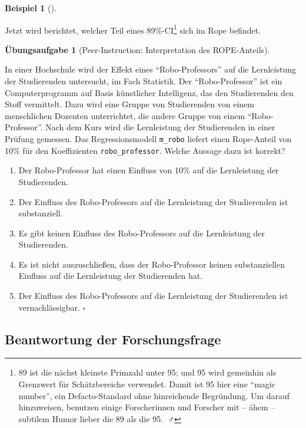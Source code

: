\documentclass[
  ngerman,
  letterpaper,
  twoside,
  open=any]{scrbook}
\providecommand{\tightlist}{%
  \setlength{\itemsep}{0pt}\setlength{\parskip}{0pt}}\usepackage{longtable,booktabs,array}
\theoremstyle{definition}
\newtheorem{example}{Beispiel}[chapter]
\theoremstyle{plain}
\theoremstyle{definition}
\newtheorem{exercise}{Übungsaufgabe}[chapter]
\theoremstyle{definition}
\theoremstyle{remark}
\begin{document}
\begin{example}[]
{\begin{longtable}[]
\end{longtable}

}

Jetzt wird berichtet, welcher Teil eines 89\%-CI\footnote{89 ist die
  nächst kleinste Primzahl unter 95; und 95 wird gemeinhin als Grenzwert
  für Schätzbereiche verwendet. Damit ist 95 hier eine \enquote{magic
  number}, ein Defacto-Standard ohne hinreichende Begründung. Um darauf
  hinzuweisen, benutzen einige Forscherinnen und Forscher mit -- ähem --
  subtilem Humor lieber die 89 als die 95. 🤷♂️} sich im Rope befindet.

\begin{exercise}[Peer-Instruction: Interpretation des
ROPE-Anteils]\protect\hypertarget{exr-peer-rope}{}\label{exr-peer-rope}

In einer Hochschule wird der Effekt eines \enquote{Robo-Professors} auf
die Lernleistung der Studierenden untersucht, im Fach Statistik. Der
\enquote{Robo-Professor} ist ein Computerprogramm auf Basis künstlicher
Intelligenz, das den Studierenden den Stoff vermittelt. Dazu wird eine
Gruppe von Studierenden von einem menschlichen Dozenten unterrichtet,
die andere Gruppe von einem \enquote{Robo-Professor}. Nach dem Kurs wird
die Lernleistung der Studierenden in einer Prüfung gemessen. Das
Regressionsmodell \texttt{m\_robo} liefert einen Rope-Anteil von 10\%
für den Koeffizienten \texttt{robo\_professor}. Welche Aussage dazu ist
korrekt?

\begin{enumerate}
\def\labelenumi{\Alph{enumi})}
\tightlist
\item
  Der Robo-Professor hat einen Einfluss von 10\% auf die Lernleistung
  der Studierenden.
\item
  Der Einfluss des Robo-Professors auf die Lernleistung der Studierenden
  ist substanziell.
\item
  Es gibt keinen Einfluss des Robo-Professors auf die Lernleistung der
  Studierenden.
\item
  Es ist nicht auszuschließen, dass der Robo-Professor keinen
  substanziellen Einfluss auf die Lernleistung der Studierenden hat.
\item
  Der Einfluss des Robo-Professors auf die Lernleistung der Studierenden
  ist vernachlässigbar. \(\square\)
\end{enumerate}

\end{exercise}

\subsection{Beantwortung der
Forschungsfrage}\label{beantwortung-der-forschungsfrage}


\end{example}
\end{document}
